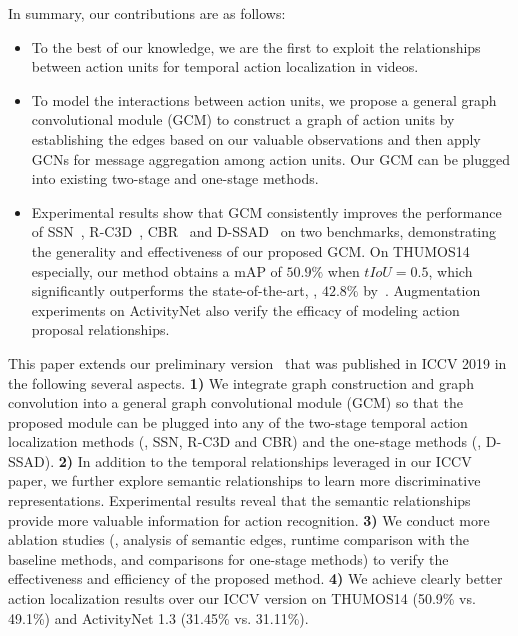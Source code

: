 \documentclass[10pt,journal,compsoc]{IEEEtran}
\def\hao{\textcolor{black}}
\begin{document}
	In summary, our contributions are as follows:
	\begin{itemize}
		\item To the best of our knowledge, we are the first to exploit the relationships between action units for temporal action localization in videos. 
		\item To model the interactions between action units, we propose a general graph convolutional  module (GCM) to construct a graph of action units by establishing the edges based on our valuable observations and then apply GCNs for message aggregation among action units. Our GCM can be plugged  into existing two-stage and one-stage methods. 
		\item Experimental results show that GCM consistently improves the performance of SSN~\cite{zhao2017temporal}, R-C3D~\cite{xu2017r}, CBR~\cite{gao2017cascaded} and D-SSAD~\cite{huang2019decoupling} on two benchmarks, demonstrating the generality and effectiveness of our proposed GCM. On THUMOS14 especially, our method obtains a mAP of $50.9\%$ when $tIoU=0.5$, which significantly outperforms the state-of-the-art, \ie, $42.8\%$ by~\cite{chao2018rethinking}. Augmentation experiments on ActivityNet also verify the efficacy of modeling action proposal relationships.
	\end{itemize}
	
	This paper extends our preliminary version~\cite{zeng2019graph} that was published in ICCV 2019 in the following several aspects. 
	\textbf{1)} We integrate graph construction and graph convolution into a general graph convolutional module (GCM) so that the proposed module can be plugged into any of the two-stage temporal action localization methods (\eg, SSN, R-C3D and CBR) and the one-stage methods (\eg, D-SSAD). 
	\textbf{2)} In addition to the temporal relationships leveraged in our ICCV paper, we further explore semantic relationships to learn more discriminative representations. Experimental results reveal that the semantic relationships provide more valuable information for action recognition.
	\textbf{3)} We conduct more ablation studies (\eg, analysis of semantic edges, runtime comparison with the baseline methods, and comparisons for one-stage methods) to verify the  effectiveness and efficiency of the proposed method. \textbf{4)} We achieve clearly better action localization results over our ICCV version on THUMOS14 (50.9\% vs. 49.1\%) and ActivityNet 1.3 (31.45\% vs. 31.11\%).
	
\end{document}
